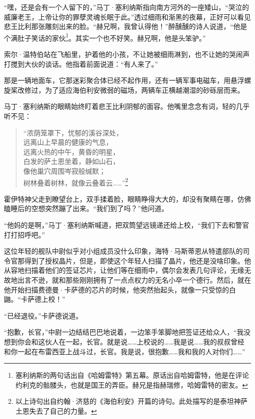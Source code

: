 \documentclass[AutoFakeBold=true]{book}
\begin{document}
``嘿，还是会有一个人留下的，''马丁·塞利纳斯指向南方河外的一座矮山，``哭泣的威廉老王，上帝让你的罪孽灵魂长眠于此。''透过细雨和渐黑的夜幕，正好可以看见悲王比利那张雕刻出来的脸。``赫兄啊，我曾认得他！''醉醺醺的诗人说道，``他是个满肚子笑话的家伙\footnote{塞利纳斯的两句话出自《哈姆雷特》第五幕。原话出自哈姆雷特，他是在评论约利克的骷髅头，也就是国王的弄臣。赫兄是指赫瑞修，哈姆雷特的密友。}。其实一个也不好笑。赫兄啊，他是头笨驴。''

索尔·温特伯站在飞船里，护着他的小孩，不让她被细雨淋到，也不让她的哭闹声打搅到大伙的谈话。他指着前面说道：``有人来了。''

那是一辆地面车，它那迷彩聚合体已经不起作用，还有一辆军事电磁车，用悬浮螺旋桨改修过，为了适应海伯利安微弱的磁场，两辆车正横越潮湿的砂砾层而来。

马丁·塞利纳斯的眼睛始终盯着悲王比利阴郁的面容。他嘴里念念有词，轻的几乎听不见：

\begin{quote}
	{\kaishu ``浓荫笼罩下，忧郁的溪谷深处，\\
	远离山上早晨的健康的气息，\\
	远离火热的中午，黄昏的明星，\\
	白发的萨土恩坐着，静如山石，\\
	像他巢穴周围岑寂般缄默；\\
	树林叠着树林，就像云叠着云……''}\footnote{以上诗句出自约翰·济慈的《海伯利安》开篇的诗句。此处描写的是泰坦神萨土恩失去了自己的力量。}
\end{quote}

霍伊特神父走到瞭望台上，双手揉着脸，眼睛睁得大大的，却没有聚睛在哪，仿佛瞌睡后的空想突然蹦了出来。``我们到了吗？''他问道。

``他妈的是啊，''马丁·塞利纳斯喊道，把双筒望远镜递还给上校，``我们下去和警官打打招呼吧。''

\vspace*{1em}

这位年轻的舰队中尉似乎对小组成员没什么印象，海特·马斯蒂恩从特遣部队的司令官那得到了授权晶片，但是，即使这个年轻人扫描了晶片，他还是没啥印象。他从容地扫描着他们的签证芯片，让他们等在细雨中，偶尔会发表几句评论，无缘无故地出言不逊，就和那些刚刚拥有了一点点权力的无名小卒一个德行。然后，就在他开始扫描费德曼·卡萨德的芯片的时候，他突然抬起头，就像一只受惊的白鼬。``卡萨德上校！''

``已经退役。''卡萨德说道。

``抱歉，长官，''中尉一边结结巴巴地说着，一边笨手笨脚地把签证还给众人，``我没想到你会和这伙人在一起，长官。就是说……上校说的……我是说……我的叔叔曾经和你一起在布雷西亚上战斗过，长官。我是说，很抱歉……我和我的人对你们……''
\end{document}
